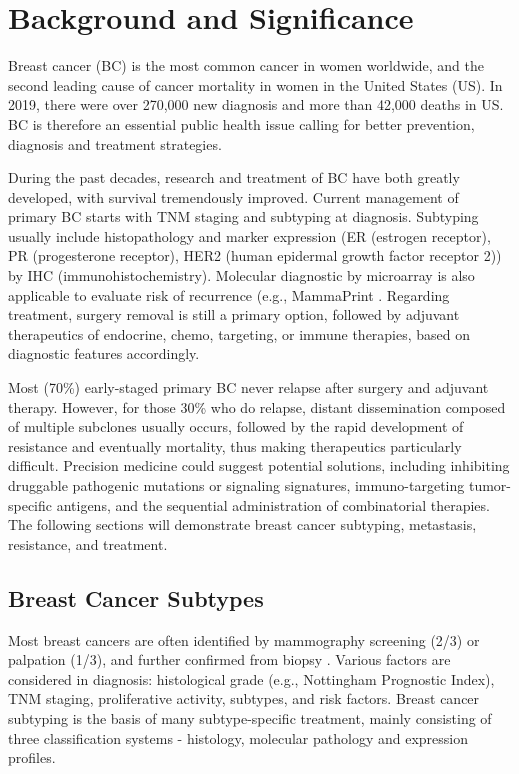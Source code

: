 \section{Background and Significance}

Breast cancer (BC) is the most common cancer in women worldwide, and the second leading cause of cancer mortality in women in the United States (US). In 2019, there were over 270,000 new diagnosis and more than 42,000 deaths in US. BC is therefore an essential public health issue calling for better prevention, diagnosis and treatment strategies.

During the past decades, research and treatment of BC have both greatly developed, with survival tremendously improved. Current management of primary BC starts with TNM staging and subtyping at diagnosis. Subtyping usually include histopathology and marker expression (ER (estrogen receptor), PR (progesterone receptor), HER2 (human epidermal growth factor receptor 2)) by IHC (immunohistochemistry). Molecular diagnostic by microarray is also applicable to evaluate risk of recurrence (e.g., MammaPrint \citep{cardoso201670}. Regarding treatment, surgery removal is still a primary option, followed by adjuvant therapeutics of endocrine, chemo, targeting, or immune therapies, based on diagnostic features accordingly.

Most (70\%) early-staged primary BC never relapse after surgery and adjuvant therapy. However, for those 30\% who do relapse, distant dissemination composed of multiple subclones usually occurs, followed by the rapid development of resistance and eventually mortality, thus making therapeutics particularly difficult. Precision medicine could suggest potential solutions, including inhibiting druggable pathogenic mutations or signaling signatures, immuno-targeting tumor-specific antigens, and the sequential administration of combinatorial therapies. The following sections will demonstrate breast cancer subtyping, metastasis, resistance, and treatment.


\subsection{Breast Cancer Subtypes}

Most breast cancers are often identified by mammography screening (2/3) or palpation (1/3), and further confirmed from biopsy \citep{caughran2018effect}. Various factors are considered in diagnosis: histological grade (e.g., Nottingham Prognostic Index), TNM staging, proliferative activity, subtypes, and risk factors. Breast cancer subtyping is the basis of many subtype-specific treatment, mainly consisting of three classification systems - histology, molecular pathology and expression profiles. 


